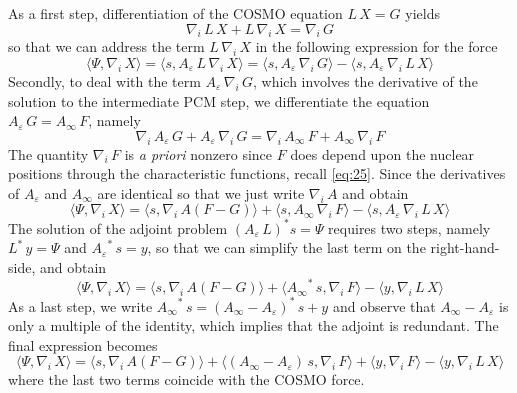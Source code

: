 \documentclass[aip,jcp,a4paper,11pt]{revtex4-1}
\newcommand{\nablai}{\nabla_{\!i}\,}
\begin{document}
As a first step, differentiation of the COSMO equation $L\, X = G$ yields
\[
\nablai L \, X + L \, \nablai X = \nablai G
\]
so that we can address the term $L \, \nablai X$ in the following expression for the force
\[
\langle \Psi , \nablai X\rangle  = \langle s ,  A_\varepsilon \, L \, \nablai X\rangle
 = \langle s ,  A_\varepsilon \, \nablai G \rangle - \langle s , A_\varepsilon \, \nablai L \,  X \rangle
\]
Secondly, to deal with the term $A_\varepsilon \, \nablai G$, which involves the derivative of the solution to the intermediate PCM step, we differentiate the equation $A_\varepsilon \, G = A_\infty \, F$, namely
\[
\nablai A_\varepsilon \, G + A_\varepsilon \, \nablai G = \nablai A_\infty \, F + A_\infty \, \nablai F
\]
The quantity $\nablai F$ is \emph{a priori} nonzero since $F$ does depend upon the nuclear positions through the characteristic functions, recall \eqref{eq:25}. Since the derivatives of $A_\varepsilon$ and $A_\infty$ are identical so that we just write $\nablai A$ and obtain
\[
\langle \Psi , \nablai X\rangle = \langle s , \nablai  A ( F - G ) \rangle + \langle  s ,{A_\infty}\, \nablai F \rangle - \langle  s , {A_\varepsilon}\, \nablai L \,  X \rangle
\]
The solution of the adjoint problem $(A_\varepsilon \, L )^* s = \Psi$ requires two steps, namely ${L}^* \, y = \Psi$ and ${A_\varepsilon}^* \, s = y$, so that we can simplify the last term on the right-hand-side, and obtain
\[
\langle \Psi , \nablai X\rangle = \langle s , \nablai  A ( F - G ) \rangle + \langle {A_\infty}^*\, s , \nablai F \rangle - \langle  y , \nablai L \,  X \rangle
\]
As a last step, we write ${A_\infty}^*\, s = ({A_\infty}-{A_\varepsilon})^*\, s + y$ and observe that ${A_\infty}-{A_\varepsilon} $ is only a multiple of the identity, which implies that the adjoint is redundant. The final expression becomes
\[
\langle \Psi , \nablai X\rangle = \langle s , \nablai  A ( F - G ) \rangle + \langle ({A_\infty}-{A_\varepsilon})\, s, \nablai F \rangle +\langle y , \nablai F \rangle - \langle  y , \nablai L \,  X \rangle
\]
where the last two terms coincide with the COSMO force.
\end{document}
